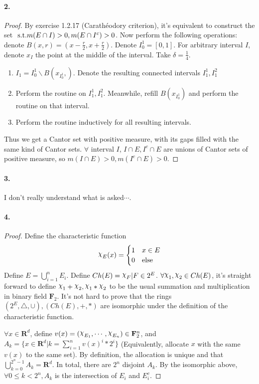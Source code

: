 \documentclass{article}
\begin{document}
\paragraph{2.}
\begin{proof}
By exercise 1.2.17 (Carath\'eodory criterion), it's equivalent to construct the set $\text{ s.t.} m(E\cap I)>0, m(E\cap I^c)>0$. Now perform the following operations: denote $B(x,r)=(x-\frac r 2,x+\frac r 2)$. Denote $I_0^1=[0,1]$. For arbitrary interval $I$, denote $x_I$ the point at the middle of the interval. Take $\delta=\frac{1}{4}$.
\begin{enumerate}
\item{} $I_1=I_0^1\backslash B(x_{I_0^1},)$. Denote the resulting connected intervals $I_1^1,I_1^2$
\item{} Perform the routine on $I_1^1, I_1^2$. Meanwhile, refill $B(x_{I_0^1})$ and perform the routine on that interval.
\item{} Perform the routine inductively for all resulting intervals.
\end{enumerate}
Thus we get a Cantor set with positive measure, with its gaps filled with the same kind of Cantor sets. $\forall$ interval $I$, $I\cap E, I^c\cap E$ are unions of Cantor sets of positive measure, so $m(I\cap E)>0,m(I^c\cap E)>0$.
\end{proof}


\paragraph{3.}
I don't really understand what is asked$\cdots$. 

\paragraph{4.}
\begin{proof}
Define the characteristic function 
\[\rchi_E(x)=\begin{cases}
1&x\in E\\
0&\text{else}
\end{cases}\]
Define $E=\bigcup\limits_{i=1}^{n}E_i$. Define $Ch(E)={\rchi_F|F\in 2^E}$. $\forall \rchi_1,\rchi_2\in Ch(E)$, it's straight forward to define $\rchi_1+\rchi_2,\rchi_1*\rchi_2$ to be the usual summation and multiplication in binary field $\mathbf{F}_2$.
It's not hard to prove that the rings $(2^E,\bigtriangleup, \cup),(Ch(E),+,*)$ are isomorphic under the definition of the characteristic function. 

$\forall x\in \mathbf{R}^d$, define $v(x)=(\rchi_{E_1},\cdots,\rchi_{E_n})\in \mathbf{F}_2^n$, and $A_k=\{x\in\mathbf{R}^d| k=\sum\limits_{i=1}^n v(x)^i*2^i\}$ (Equivalently, allocate $x$ with the same $v(x)$ to the same set). By definition, the allocation is unique and that $\bigcup\limits_{k=0}^{2^n-1}A_k=\mathbf{R}^d$. In total, there are $2^n$ disjoint $A_k$. By the isomorphic above, $\forall 0\leq k< 2^n, A_k$ is the intersection of $E_i$ and $E_i^c$.
\end{proof}
\end{document}
